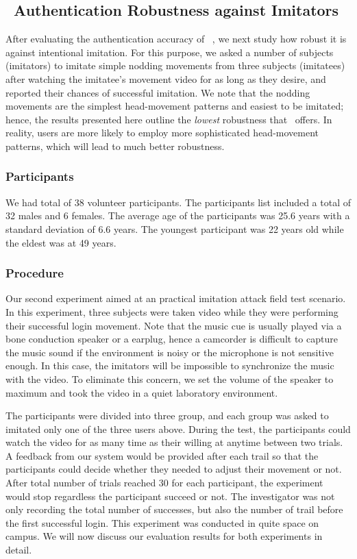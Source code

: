 
\subsection{\systemname~Authentication Robustness against Imitators} After evaluating the authentication accuracy of \systemname~, we next study how robust it is against intentional imitation. For this purpose, we asked a number of subjects (imitators) to imitate simple nodding movements from three subjects (imitatees) after watching the imitatee's movement video for as long as they desire, and reported their chances of successful imitation. We note that the nodding movements are the simplest head-movement patterns and easiest to be imitated; hence, the results presented here outline the \emph{lowest} robustness that \systemname~offers. In reality, users are more likely to employ more sophisticated head-movement patterns, which will lead to much better robustness. 

\subsubsection{Participants}
We had total of 38 volunteer participants. The participants list included a total of 32 males and 6 females.
The average age of the participants was 25.6 years with a standard deviation
of 6.6 years. The youngest participant was 22 years old while the eldest was
at 49 years.
\subsubsection{Procedure}
Our second experiment aimed at an practical imitation attack field test scenario. In this experiment, three subjects were taken video while they were performing their successful login movement. Note that the music cue is usually played via a bone conduction speaker or a earplug, hence a camcorder is difficult to capture the music sound if the environment is noisy or the microphone is not sensitive enough. In this case, the imitators will be impossible to synchronize the music with the video. To eliminate this concern, we set the volume of the speaker to maximum and took the video in a quiet laboratory environment.

The participants were divided into three group, and each group was asked to imitated only one of the three users above. During the test, the participants could watch the video for as many time as their willing at anytime between two trials. A feedback from our system would be provided after each trail so that the participants could decide whether they needed to adjust their movement or not. After total number of trials reached 30 for each participant, the experiment would stop regardless the participant succeed or not. The investigator was not only recording the total number of successes, but also the number of trail before the first successful login. This experiment was conducted in quite space on campus. We will now discuss our evaluation results for both experiments in detail.

